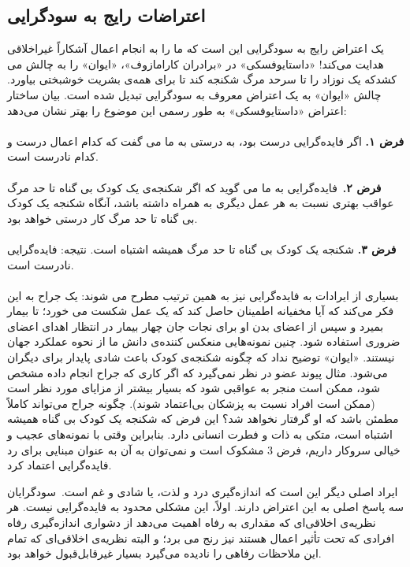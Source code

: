 \subsection*{اعتراضات رایج به سودگرایی}
\label{subsec:اعتراضات رایج به سودگرایی}
یک اعتراض رایج به سودگرایی این است که ما را به انجام اعمال آشکاراً غیراخلاقی هدایت می‌کند!
«داستایوفسکی» در «برادران کارامازوف»، «ایوان» را به چالش می کشدکه یک نوزاد را تا سرحد مرگ شکنجه کند تا برای همه‌ی بشریت خوشبختی بیاورد.
چالش «ایوان» به یک اعتراض معروف به سودگرایی تبدیل شده است.
بیان ساختار اعتراض «داستایوفسکی» به طور رسمی این موضوع را بهتر نشان می‌دهد:
\\\\
\textbf{فرض ۱.}
اگر فایده‌گرایی درست بود، به درستی به ما می گفت که کدام اعمال درست و کدام نادرست است.
\\\\
\textbf{فرض ۲.}\     فایده‌گرایی به ما می گوید که اگر شکنجه‌ی یک کودک بی گناه تا حد مرگ عواقب بهتری نسبت به هر عمل دیگری به همراه داشته باشد، آنگاه شکنجه یک کودک بی گناه تا حد مرگ کار درستی خواهد بود.
\\\\
\textbf{فرض ۳.}
شکنجه یک کودک بی گناه تا حد مرگ همیشه اشتباه است.
نتیجه: فایده‌گرایی نادرست است.
\\\\
بسیاری از ایرادات به فایده‌گرایی نیز به همین ترتیب مطرح می شوند: یک جراح به این فکر می‌کند که آیا مخفیانه اطمینان حاصل کند که یک عمل شکست می خورد؛ تا بیمار بمیرد و سپس از اعضای بدن او برای نجات جان چهار بیمار در انتظار اهدای اعضای ضروری استفاده شود.
چنین نمونه‌هایی منعکس کننده‌ی دانش ما از نحوه عملکرد جهان نیستند.
«ایوان» توضیح نداد که چگونه شکنجه‌ی کودک باعث شادی پایدار برای دیگران می‌شود.
مثال پیوند عضو در نظر نمی‌گیرد که اگر کاری که جراح انجام داده مشخص شود، ممکن است منجر به عواقبی شود که بسیار بیشتر از مزایای مورد نظر است (ممکن است افراد نسبت به پزشکان بی‌اعتماد شوند).
چگونه جراح می‌تواند کاملاً مطمئن باشد که او گرفتار نخواهد شد؟ این فرض که شکنجه یک کودک بی گناه همیشه اشتباه است، متکی به ذات و فطرت انسانی دارد.
بنابراین وقتی با نمونه‌های عجیب و خیالی سروکار داریم، فرض 3 مشکوک است و نمی‌توان به آن به عنوان مبنایی برای رد فایده‌گرایی اعتماد کرد.

ایراد اصلی دیگر این است که اندازه‌گیری درد و لذت، یا شادی و غم است.\     سودگرایان سه پاسخ اصلی به این اعتراض دارند.
اولاً، این مشکلی محدود به فایده‌گرایی نیست.
هر نظریه‌ی اخلاقی‌ای که مقداری به رفاه اهمیت می‌دهد از دشواری اندازه‌گیری رفاه افرادی که تحت تأثیر اعمال هستند نیز رنج می برد؛ و البته نظریه‌ی اخلاقی‌ای که تمام این ملاحظات رفاهی را نادیده می‌گیرد بسیار غیرقابل‌قبول خواهد بود.

